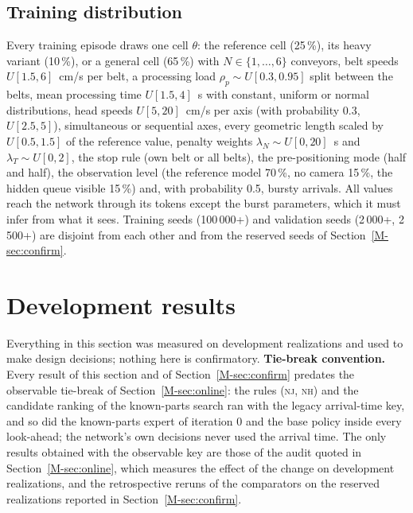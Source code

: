 \documentclass[11pt,a4paper]{article}
\theoremstyle{plain}
\theoremstyle{definition}
\theoremstyle{remark}
\newcommand{\nj}{\textsc{nj}}
\newcommand{\nh}{\textsc{nh}}
\begin{document}
\subsection{Training distribution}
Every training episode draws one cell $\theta$: the reference cell (25\,\%), its heavy
variant (10\,\%), or a general cell (65\,\%) with $N\in\{1,\dots,6\}$ conveyors, belt
speeds $U[1.5,6]$~cm/s per belt, a processing load $\rho_p\sim U[0.3,0.95]$ split between
the belts, mean processing time $U[1.5,4]$~s with constant, uniform or normal
distributions, head speeds $U[5,20]$~cm/s per axis (with probability 0.3, $U[2.5,5]$),
simultaneous or sequential axes, every geometric length scaled by $U[0.5,1.5]$ of the
reference value, penalty weights $\lambda_N\sim U[0,20]$~s and $\lambda_T\sim U[0,2]$, the
stop rule (own belt or all belts), the pre-positioning mode (half and half), the
observation level (the reference model 70\,\%, no camera 15\,\%, the hidden queue visible
15\,\%) and, with probability 0.5, bursty arrivals. All values reach the network through
its tokens except the burst parameters, which it must infer from what it sees. Training
seeds (100\,000+) and validation seeds (2\,000+, 2\,500+) are disjoint from each other and
from the reserved seeds of Section~\ref{M-sec:confirm}.

\section{Development results}\label{sec:devfull}
Everything in this section was measured on development realizations and used to make
design decisions; nothing here is confirmatory. \textbf{Tie-break convention.} Every
result of this section and of Section~\ref{M-sec:confirm} predates the observable
tie-break of Section~\ref{M-sec:online}: the rules (\nj, \nh) and the candidate ranking of
the known-parts search ran with the legacy arrival-time key, and so did the known-parts
expert of iteration 0 and the base policy inside every look-ahead; the network's own
decisions never used the arrival time. The only results obtained with the observable
key are those of the audit quoted in Section~\ref{M-sec:online}, which measures the
effect of the change on development realizations, and the retrospective reruns of the
comparators on the reserved realizations reported in Section~\ref{M-sec:confirm}.
\end{document}
